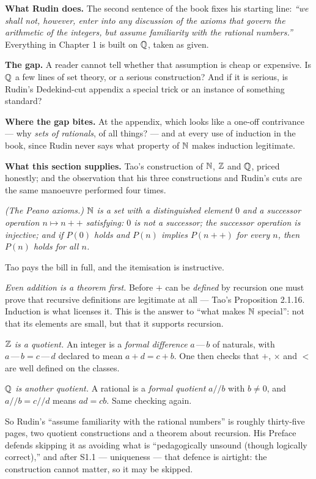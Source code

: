 \begin{roadmap}
\raggedright
\textbf{What Rudin does.} The second sentence of the book fixes his starting
line: \emph{``we shall not, however, enter into any discussion of the axioms
that govern the arithmetic of the integers, but assume familiarity with the
rational numbers.''} Everything in Chapter 1 is built on $\mathbb{Q}$, taken as given.

\smallskip
\textbf{The gap.} A reader cannot tell whether that assumption is cheap or
expensive. Is $\mathbb{Q}$ a few lines of set theory, or a serious construction? And
if it is serious, is Rudin's Dedekind-cut appendix a special trick or an
instance of something standard?

\smallskip
\textbf{Where the gap bites.} At the appendix, which looks like a
one-off contrivance --- why \emph{sets of rationals}, of all things? --- and
at every use of induction in the book, since Rudin never says what property
of $\mathbb{N}$ makes induction legitimate.

\smallskip
\textbf{What this section supplies.} Tao's construction of $\mathbb{N}$, $\mathbb{Z}$ and
$\mathbb{Q}$, priced honestly; and the observation that his three constructions and
Rudin's cuts are the same manoeuvre performed four times.
\end{roadmap}

\emph{(The Peano axioms.) $\mathbb{N}$ is a set with a distinguished element $0$ and
a successor operation $n \mapsto n{+}{+}$ satisfying: $0$ is not a successor;
the successor operation is injective; and if $P(0)$ holds and $P(n)$ implies
$P(n{+}{+})$ for every $n$, then $P(n)$ holds for all $n$.}

\begin{deeper}
Tao pays the bill in full, and the itemisation is instructive.

\smallskip
\emph{Even addition is a theorem first.} Before $+$ can be \emph{defined} by
recursion one must prove that recursive definitions are legitimate at all ---
Tao's Proposition 2.1.16. Induction is what licenses it. This is the answer
to ``what makes $\mathbb{N}$ special'': not that its elements are small, but that it
supports recursion.

\smallskip
\emph{$\mathbb{Z}$ is a quotient.} An integer is a \emph{formal difference}
$a \,\text{---}\, b$ of naturals, with $a\,\text{---}\,b = c\,\text{---}\,d$
declared to mean $a+d = c+b$. One then checks that $+$, $\times$ and $<$ are
well defined on the classes.

\smallskip
\emph{$\mathbb{Q}$ is another quotient.} A rational is a \emph{formal quotient}
$a /\!/ b$ with $b \ne 0$, and $a/\!/b = c/\!/d$ means $ad = cb$. Same
checking again.

\smallskip
So Rudin's ``assume familiarity with the rational numbers'' is roughly
thirty-five pages, two quotient constructions and a theorem about recursion.
His Preface defends skipping it as avoiding what is ``pedagogically unsound
(though logically correct),'' and after S1.1 --- uniqueness --- that defence
is airtight: the construction cannot matter, so it may be skipped.
\end{deeper}

